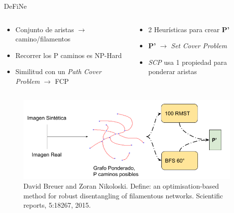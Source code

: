 \documentclass[]{beamer}
\begin{document}
\begin{frame}{DeFiNe}
    \begin{columns}
        \begin{column}{0.55\textwidth}
            \begin{itemize}\fontsize{9pt}{5}\selectfont
                \item Conjunto de aristas $\rightarrow$ camino/filamentos
                \item Recorrer los P caminos es NP-Hard
                \item Similitud con un {\it Path Cover Problem} $\rightarrow$ FCP
            \end{itemize}        
        \end{column}
        \begin{column}{0.45\textwidth}
            \begin{itemize}\fontsize{9pt}{7.2}\selectfont
                \item 2 Heur\'isticas para crear {\bf P'}
                \item {\bf P'} $\rightarrow$ {\it Set Cover Problem}
                \item {\it SCP} usa 1 propiedad para ponderar aristas
            \end{itemize}
        \end{column}
    \end{columns}
    \begin{figure}
        \centering
        \includegraphics[scale=0.42]{Pictures/flujoDefine2.png}
        \caption{David Breuer and Zoran Nikoloski. Define: an optimisation-based method for robust disentangling of filamentous networks. Scientific reports, 5:18267, 2015.}
    \end{figure}
\end{frame}
\end{document}
